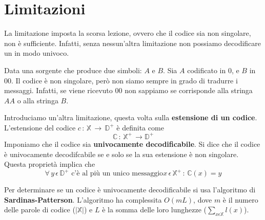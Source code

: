 \documentclass[12pt]{report}
\begin{document}
    \section{Limitazioni}

    La limitazione imposta la scorsa lezione, ovvero che il codice sia non singolare, non è sufficiente. Infatti, senza nessun'altra limitazione non possiamo decodificare un in modo univoco.  \\

    \begin{exmp}
        Data una sorgente che produce due simboli: $A$ e $B$.
        Sia $A$ codificato in $0$, e $B$ in $00$. Il codice è non singolare, però non siamo sempre in grado di tradurre i messaggi. Infatti, se viene ricevuto $00$ non sappiamo se corrisponde alla stringa $AA$ o alla stringa $B$.
    \end{exmp}


    \noindent Introduciamo un'altra limitazione, questa volta sulla \textbf{estensione di un codice}.  L'estensione del codice $c\,:\, \mathbb{X}\,\rightarrow \, \mathbb{D}^+$ è definita come $$\mathbb{C}\, : \, \mathbb{X}^+ \, \rightarrow \mathbb{D}^+$$
    Imponiamo che il codice sia \textbf{univocamente decodificabile}. Si dice che il codice è univocamente decodifcabile se e solo se la sua estensione è non singolare. Questa proprietà implica che
    $$\forall \, y \, \epsilon \, \mathbb{D}^+ \,\,\text{c'è al più un  unico messaggio}
    x\,\epsilon\,\mathbb{X}^+ \,: \, \mathbb{C}(x) = y$$

    \noindent Per determinare se un codice è univocamente decodificabile si usa l'algoritmo di \textbf{Sardinas-Patterson}. L'algoritmo ha complessita $O(mL)$, dove $m$ è il numero delle parole di codice ($|\mathbb{X}|$) e $L$ è la somma delle loro lunghezze ($\sum_{x\epsilon\mathbb{X}} l(x)$). \\

    \begin{center}
        \def\firstcircle{(0,0) circle (1.5cm)}
        \def\secondcircle{(5:1cm) circle (3cm)}
    \end{center}
    \vspace{10px}
\end{document}
